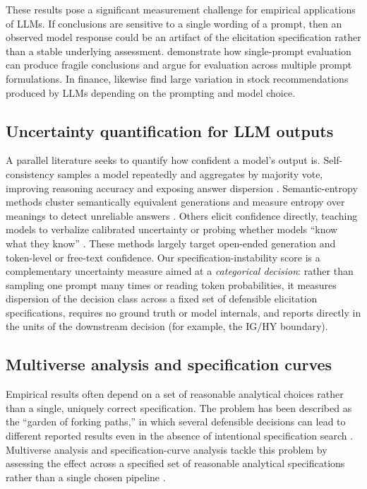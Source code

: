 \documentclass[a4paper,fleqn]{cas-sc}
\begin{document}
These results pose a significant measurement challenge for empirical applications of LLMs. If conclusions
are sensitive to a single wording of a prompt, then an observed model response could be an artifact of
the elicitation specification rather than a stable underlying assessment. \citet{mizrahi2024multiprompt}
demonstrate how single-prompt evaluation can produce fragile conclusions and argue for evaluation across
multiple prompt formulations. In finance, \citet{chon2025variability} likewise find large variation in
stock recommendations produced by LLMs depending on the prompting and model choice.

\subsection{Uncertainty quantification for LLM outputs}
A parallel literature seeks to quantify how confident a model's output is. Self-consistency samples a model
repeatedly and aggregates by majority vote, improving reasoning accuracy and exposing answer dispersion
\citep{wang2023selfconsistency}. Semantic-entropy methods cluster semantically equivalent generations and
measure entropy over meanings to detect unreliable answers \citep{kuhn2023semantic}. Others elicit
confidence directly, teaching models to verbalize calibrated uncertainty \citep{lin2022teaching} or
probing whether models ``know what they know'' \citep{kadavath2022language}. These methods largely target
open-ended generation and token-level or free-text confidence. Our specification-instability score is a
complementary uncertainty measure aimed at a \emph{categorical decision}: rather than sampling one prompt
many times or reading token probabilities, it measures dispersion of the decision class across a fixed set
of defensible elicitation specifications, requires no ground truth or model internals, and reports directly
in the units of the downstream decision (for example, the IG/HY boundary).

\subsection{Multiverse analysis and specification curves}
Empirical results often depend on a set of reasonable analytical choices rather than a single, uniquely
correct specification. The problem has been described as the ``garden of forking paths,'' in which
several defensible decisions can lead to different reported results even in the absence of intentional
specification search \citep{gelman2013garden,simmons2011false}. Multiverse analysis and
specification-curve analysis tackle this problem by assessing the effect across a specified set of
reasonable analytical specifications rather than a single chosen pipeline
\citep{steegen2016multiverse,simonsohn2020specification}.
\end{document}
